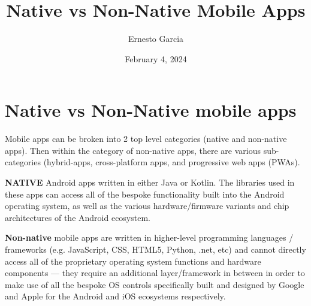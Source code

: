 \documentclass{article}
\title{Native vs Non-Native Mobile Apps}
\author{Ernesto Garcia}
\date{February 4, 2024}
\begin{document}
\maketitle

\section{Native vs Non-Native mobile apps}
Mobile apps can be broken into 2 top level categories (native and non-native apps). Then within the category of non-native apps, there are various sub-categories (hybrid-apps, cross-platform apps, and progressive web apps (PWAs).\bigskip

\textbf{NATIVE} Android apps written in either Java or Kotlin. The libraries used in these apps can access all of the bespoke functionality built into the Android operating system, as well as the various hardware/firmware variants and chip architectures of the Android ecosystem.

\bigskip\textbf{Non-native} mobile apps are written in higher-level programming languages / frameworks (e.g. JavaScript, CSS, HTML5, Python, .net, etc) and cannot directly access all of the proprietary operating system functions and hardware components — they require an additional layer/framework in between in order to make use of all the bespoke OS controls specifically built and designed by Google and Apple for the Android and iOS ecosystems respectively.\bigskip
\end{document}
